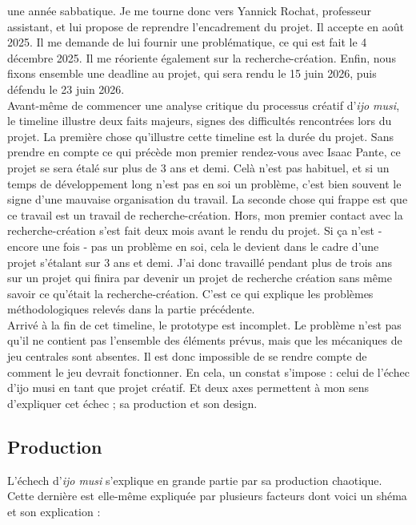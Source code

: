 \documentclass{scrartcl}
\begin{document}
une année sabbatique. Je me tourne donc vers Yannick Rochat, professeur assistant, et lui propose de reprendre l'encadrement du projet. Il accepte en août 2025. Il me demande de lui fournir une problématique, ce qui est fait le 4 décembre 2025. Il me réoriente également sur la recherche-création. Enfin, nous fixons ensemble une deadline au projet, qui sera rendu le 15 juin 2026, puis défendu le 23 juin 2026.\\
	
	Avant-même de commencer une analyse critique du processus créatif d'\textit{ijo musi}, le timeline illustre deux faits majeurs, signes des difficultés rencontrées lors du projet. La première chose qu'illustre cette timeline est la durée du projet. Sans prendre en compte ce qui précède mon premier rendez-vous avec Isaac Pante, ce projet se sera étalé sur plus de 3 ans et demi. Celà n'est pas habituel, et si un temps de développement long n'est pas en soi un problème, c'est bien souvent le signe d'une mauvaise organisation du travail. La seconde chose qui frappe est que ce travail est un travail de recherche-création. Hors, mon premier contact avec la recherche-création s'est fait deux mois avant le rendu du projet. Si ça n'est - encore une fois - pas un problème en soi, cela le devient dans le cadre d'une projet s'étalant sur 3 ans et demi. J'ai donc travaillé pendant plus de trois ans sur un projet qui finira par devenir un projet de recherche création sans même savoir ce qu'était la recherche-création. C'est ce qui explique les problèmes méthodologiques relevés dans la partie précédente.\\
	
	Arrivé à la fin de cet timeline, le prototype est incomplet. Le problème n'est pas qu'il ne contient pas l'ensemble des éléments prévus, mais que les mécaniques de jeu centrales sont absentes. Il est donc impossible de se rendre compte de comment le jeu devrait fonctionner. En cela, un constat s'impose : celui de l'échec d'ijo musi en tant que projet créatif. Et deux axes permettent à mon sens d'expliquer cet échec ; sa production et son design.
	

	
	\subsection*{Production}
	L'échech d'\textit{ijo musi} s'explique en grande partie par sa production chaotique. Cette dernière est elle-même expliquée par plusieurs facteurs dont voici un shéma et son explication :\\
\end{document}
